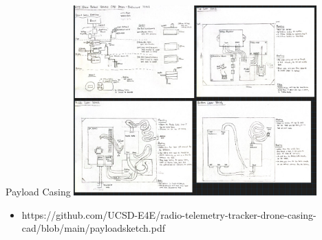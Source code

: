 \begin{frame}{Payload Casing}
    \centering
    \includegraphics[height=0.7\textheight,width=0.7\textwidth,keepaspectratio]{images/rtt/cad.jpg}
    \begin{itemize}
        \item https://github.com/UCSD-E4E/radio-telemetry-tracker-drone-casing-cad/blob/main/payloadsketch.pdf
    \end{itemize}
\end{frame}


